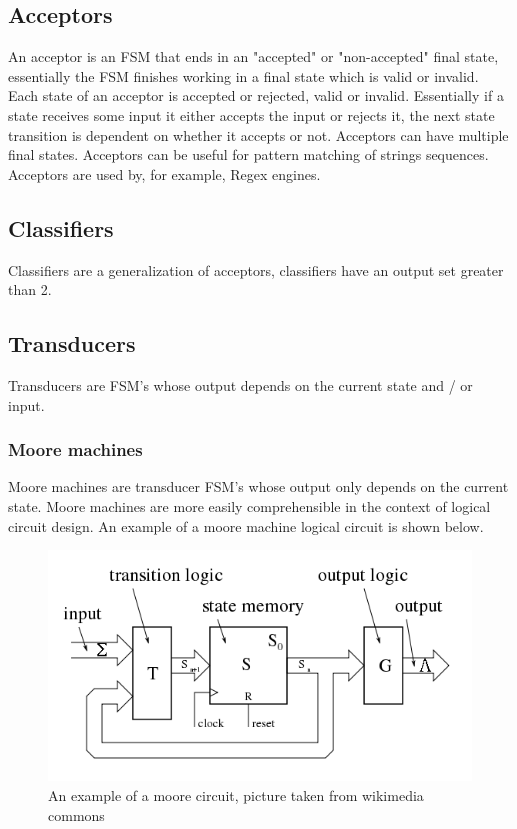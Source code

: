 \documentclass[a4paper,11pt]{article}
\begin{document}
\subsection*{Acceptors}
An acceptor is an FSM that ends in an "accepted" or "non-accepted" final state, essentially the FSM finishes working in a final state which is valid or invalid. Each state of an acceptor is accepted or rejected, valid or invalid. Essentially if a state receives some input it either accepts the input or rejects it, the next state transition is dependent on whether it accepts or not. Acceptors can have multiple final states. Acceptors can be useful for pattern matching of strings sequences. Acceptors are used by, for example, Regex engines.

\subsection*{Classifiers}
Classifiers are a generalization of acceptors, classifiers have an output set greater than 2.

\subsection*{Transducers}

Transducers are FSM's whose output depends on the current state and / or input. 

\subsubsection*{Moore machines}
Moore machines are transducer FSM's whose output only depends on the current state. Moore machines are more easily comprehensible in the context of logical circuit design. An example of a moore machine logical circuit is shown below. 
\begin{figure}[H]
    \centering
    \includegraphics[width=1\textwidth]{moorecirc.png}
    \caption{An example of a moore circuit, picture taken from wikimedia commons}
    \label{fig:example_image}
\end{figure}
\end{document}
